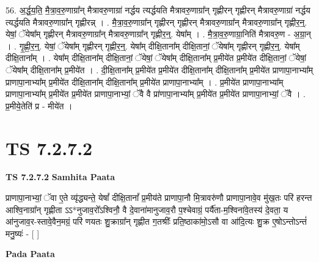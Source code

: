\documentclass[17pt]{extarticle}
\begin{document}
56. अ॒र्द्ध॒य॒ति॒ मै॒त्रा॒व॒रु॒णाग्रा᳚न् मैत्रावरु॒णाग्रा॑ नर्द्धय त्यर्द्धयति मैत्रावरु॒णाग्रा᳚न् गृह्णीरन् गृह्णीरन् मैत्रावरु॒णाग्रा॑ नर्द्धय त्यर्द्धयति मैत्रावरु॒णाग्रा᳚न् गृह्णीरन्न् । . मै॒त्रा॒व॒रु॒णाग्रा᳚न् गृह्णीरन् गृह्णीरन् मैत्रावरु॒णाग्रा᳚न् मैत्रावरु॒णाग्रा᳚न् गृह्णीर॒न्॒. येषां॒ ॅयेषा᳚म् गृह्णीरन् मैत्रावरु॒णाग्रा᳚न् मैत्रावरु॒णाग्रा᳚न् गृह्णीर॒न्॒. येषा᳚म् । . मै॒त्रा॒व॒रु॒णाग्रा॒निति॑ मैत्रावरु॒ण - अ॒ग्रा॒न् । . गृ॒ह्णी॒र॒न्॒. येषां॒ ॅयेषा᳚म् गृह्णीरन् गृह्णीर॒न्॒. येषा᳚म् दीक्षि॒ताना᳚म् दीक्षि॒तानां॒ ॅयेषा᳚म् गृह्णीरन् गृह्णीर॒न्॒. येषा᳚म् दीक्षि॒ताना᳚म् । . येषा᳚म् दीक्षि॒ताना᳚म् दीक्षि॒तानां॒ ॅयेषां॒ ॅयेषा᳚म् दीक्षि॒ताना᳚म् प्र॒मीये॑त प्र॒मीये॑त दीक्षि॒तानां॒ ॅयेषां॒ ॅयेषा᳚म् दीक्षि॒ताना᳚म् प्र॒मीये॑त । . दी॒क्षि॒ताना᳚म् प्र॒मीये॑त प्र॒मीये॑त दीक्षि॒ताना᳚म् दीक्षि॒ताना᳚म् प्र॒मीये॑त प्राणापा॒नाभ्या᳚म् प्राणापा॒नाभ्या᳚म् प्र॒मीये॑त दीक्षि॒ताना᳚म् दीक्षि॒ताना᳚म् प्र॒मीये॑त प्राणापा॒नाभ्या᳚म् । . प्र॒मीये॑त प्राणापा॒नाभ्या᳚म् प्राणापा॒नाभ्या᳚म् प्र॒मीये॑त प्र॒मीये॑त प्राणापा॒नाभ्यां॒ ॅवै वै प्रा॑णापा॒नाभ्या᳚म् प्र॒मीये॑त प्र॒मीये॑त प्राणापा॒नाभ्यां॒ ॅवै । . प्र॒मीये॒तेति॑ प्र - मीये॑त । \newline
\pagebreak
{}

\section{ TS 7.2.7.2 }

\textbf{TS 7.2.7.2 } \newline
\textbf{Samhita Paata} \newline

प्राणापा॒नाभ्यां॒ ॅवा ए॒ते व्यृ॑द्ध्यन्ते॒ येषां᳚ दीक्षि॒तानां᳚ प्र॒मीय॑ते प्राणापा॒नौ मि॒त्रावरु॑णौ प्राणापा॒नावे॒व मु॑ख॒तः परि॑ हरन्त आश्वि॒नाग्रा᳚न् गृह्णीता ऽऽ*नुजाव॒रो᳚ऽश्विनौ॒ वै दे॒वाना॑मानुजाव॒रौ प॒श्चेवाग्रं॒ पर्यै॑ता-म॒श्विना॑वे॒तस्य॑ दे॒वता॒ य आ॑नुजाव॒र-स्तावे॒वैन॒मग्रं॒ परि॑ णयतः शु॒क्राग्रा᳚न् गृह्णीत ग॒तश्रीः᳚ प्रति॒ष्ठाका॑मो॒ऽसौ वा आ॑दि॒त्यः शु॒क्र ए॒षोऽन्तोऽन्तं॑ मनु॒ष्यः॑ - [  ] \newline

\textbf{Pada Paata} \newline
\end{document}
